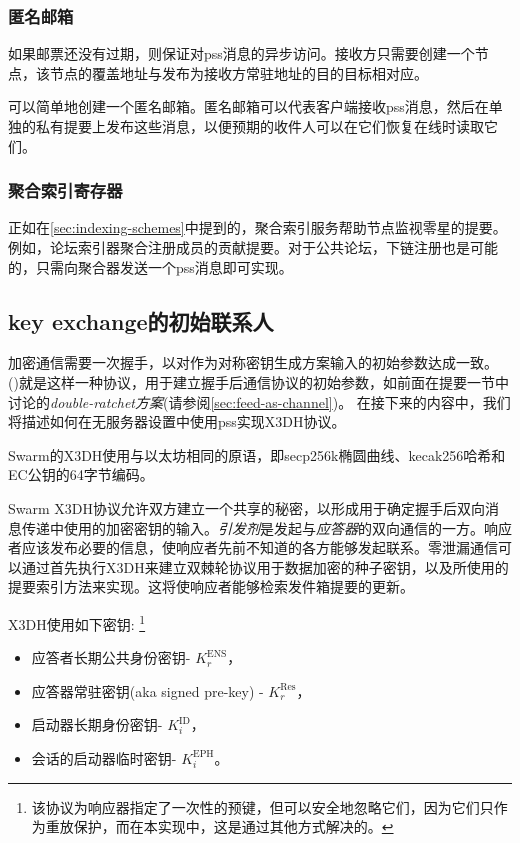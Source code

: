\subsubsection{匿名邮箱}

如果邮票还没有过期，则保证对pss消息的异步访问。接收方只需要创建一个节点，该节点的覆盖地址与发布为接收方常驻地址的目的目标相对应。

可以简单地创建一个匿名邮箱。匿名邮箱可以代表客户端接收pss消息，然后在单独的私有提要上发布这些消息，以便预期的收件人可以在它们恢复在线时读取它们。

\subsubsection{聚合索引寄存器}

正如在\ref{sec:indexing-schemes}中提到的，聚合索引服务帮助节点监视零星的提要。例如，论坛索引器聚合注册成员的贡献提要。对于公共论坛，下链注册也是可能的，只需向聚合器发送一个pss消息即可实现。 


\subsection{key exchange的初始联系人\statusgreen}\label{sec:pss-key-exchange}


加密通信需要一次握手，以对作为对称密钥生成方案输入的初始参数达成一致。 ()就是这样一种协议\cite{marlinspike2016x3dh}，用于建立握手后通信协议的初始参数，如前面在提要一节中讨论的\emph{double-ratchet方案}(请参阅\ref{sec:feed-as-channel})。
在接下来的内容中，我们将描述如何在无服务器设置中使用pss实现X3DH协议。

Swarm的X3DH使用与以太坊相同的原语，即secp256k椭圆曲线、kecak256哈希和EC公钥的64字节编码。

Swarm X3DH协议允许双方建立一个共享的秘密，以形成用于确定握手后双向消息传递中使用的加密密钥的输入。\emph{引发剂}是发起与\emph{应答器}的双向通信的一方。响应者应该发布必要的信息，使响应者先前不知道的各方能够发起联系。零泄漏通信可以通过首先执行X3DH来建立双棘轮协议用于数据加密的种子密钥，以及所使用的提要索引方法来实现。这将使响应者能够检索发件箱提要的更新。

X3DH使用如下密钥:%
%
\footnote{该协议为响应器指定了一次性的预键，但可以安全地忽略它们，因为它们只作为重放保护，而在本实现中，这是通过其他方式解决的。}

\begin{itemize}
\item 应答者长期公共身份密钥- $K^{\mathrm{ENS}}_r$，
\item 应答器常驻密钥(aka signed pre-key) - $K^{\mathrm{Res}}_r$，
\item 启动器长期身份密钥- $K^{\mathrm{ID}}_i$，
\item 会话的启动器临时密钥- $K^{\mathrm{EPH}}_i$。
\end{itemize}{}



